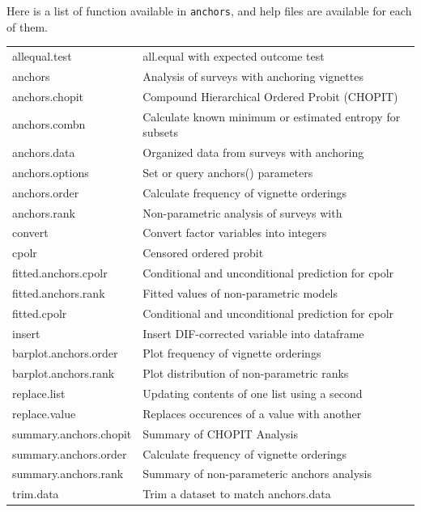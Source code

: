 \documentclass{amsart}
\newcommand{\Ranchors}{{\texttt{anchors}}}
\begin{document}
Here is a list of function available in \Ranchors, and help
files are available for each of them.
\begin{tabular}{ll}
allequal.test           & all.equal with expected outcome test               \\
anchors                 & Analysis of surveys with anchoring vignettes       \\
anchors.chopit          & Compound Hierarchical Ordered Probit (CHOPIT)	     \\
anchors.combn           & Calculate known minimum or estimated entropy for subsets\\
anchors.data            & Organized data from surveys with anchoring	     \\
anchors.options         & Set or query anchors() parameters		     \\
anchors.order           & Calculate frequency of vignette orderings	     \\
anchors.rank            & Non-parametric analysis of surveys with	     \\
convert                 & Convert factor variables into integers	     \\
cpolr                   & Censored ordered probit			     \\
fitted.anchors.cpolr    & Conditional and unconditional prediction for cpolr \\
fitted.anchors.rank     & Fitted values of non-parametric models	     \\
fitted.cpolr            & Conditional and unconditional prediction for cpolr \\
insert                  & Insert DIF-corrected variable into dataframe	     \\
barplot.anchors.order   & Plot frequency of vignette orderings		     \\
barplot.anchors.rank    & Plot distribution of non-parametric ranks	     \\
replace.list            & Updating contents of one list using a second	     \\
replace.value           & Replaces occurences of a value with another	     \\
summary.anchors.chopit  & Summary of CHOPIT Analysis			     \\
summary.anchors.order   & Calculate frequency of vignette orderings	     \\
summary.anchors.rank    & Summary of non-parameteric anchors analysis	     \\
trim.data               & Trim a dataset to match anchors.data               \\   
\end{tabular}
\end{document}
